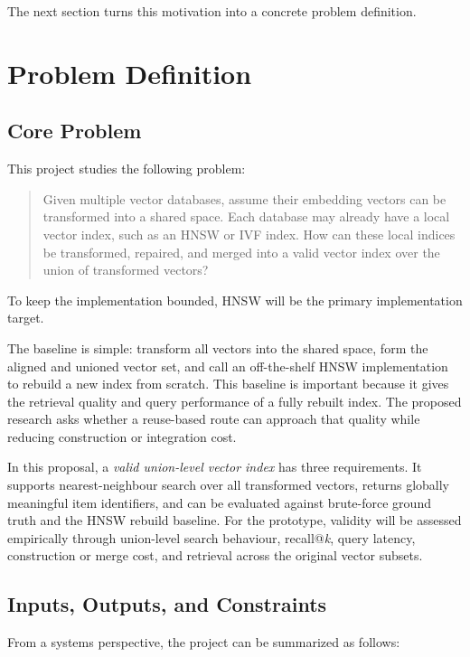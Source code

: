 \documentclass[11pt]{article}
\begin{document}
The next section turns this motivation into a concrete problem definition.

\section{Problem Definition}

\subsection{Core Problem}

This project studies the following problem:

\begin{quote}
Given multiple vector databases, assume their embedding vectors can be transformed into a shared space. Each database may already have a local vector index, such as an HNSW or IVF index. How can these local indices be transformed, repaired, and merged into a valid vector index over the union of transformed vectors?
\end{quote}

To keep the implementation bounded, HNSW will be the primary implementation target.

The baseline is simple: transform all vectors into the shared space, form the aligned and unioned vector set, and call an off-the-shelf HNSW implementation to rebuild a new index from scratch. This baseline is important because it gives the retrieval quality and query performance of a fully rebuilt index. The proposed research asks whether a reuse-based route can approach that quality while reducing construction or integration cost.

In this proposal, a \emph{valid union-level vector index} has three requirements. It supports nearest-neighbour search over all transformed vectors, returns globally meaningful item identifiers, and can be evaluated against brute-force ground truth and the HNSW rebuild baseline. For the prototype, validity will be assessed empirically through union-level search behaviour, recall@\textit{k}, query latency, construction or merge cost, and retrieval across the original vector subsets.

\subsection{Inputs, Outputs, and Constraints}

From a systems perspective, the project can be summarized as follows:
\end{document}

